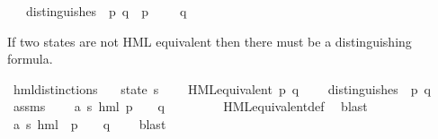 \begin{isabellebody}
\ \ \ {\isacartoucheopen}distinguishes\ {\isasymphi}\ p\ q\ {\isasymequiv}\ p\ {\isasymTurnstile}\ {\isasymphi}\ {\isasymand}\ {\isasymnot}\ q\ {\isasymTurnstile}\ {\isasymphi}{\isacartoucheclose}%
\begin{isamarkuptext}%
If two states are not HML equivalent then there must be a
  distinguishing formula.%
\end{isamarkuptext}\isamarkuptrue%
\isamarkupfalse%
\ hml{\isacharunderscore}{\kern0pt}distinctions{\isacharcolon}{\kern0pt}\isanewline
\ \ \ state{\isacharcolon}{\kern0pt}{\isacharcolon}{\kern0pt}\ {\isacharprime}{\kern0pt}s\isanewline
\ \ \ {\isacartoucheopen}{\isasymnot}\ HML{\isacharunderscore}{\kern0pt}equivalent\ p\ q{\isacartoucheclose}\isanewline
\ \ \ {\isacartoucheopen}{\isasymexists}{\isasymphi}{\isachardot}{\kern0pt}\ distinguishes\ {\isasymphi}\ p\ q{\isacartoucheclose}\isanewline
%
\isadelimproof
%
\endisadelimproof
%
\isatagproof
{}\isamarkupfalse%
{\isacharminus}{\kern0pt}\isanewline
\ \ \isamarkupfalse%
\ assms\ \isamarkupfalse%
\ {\isachardoublequoteopen}{\isasymnot}\ {\isacharparenleft}{\kern0pt}{\isasymforall}\ {\isasymphi}{\isacharcolon}{\kern0pt}{\isacharcolon}{\kern0pt}{\isacharparenleft}{\kern0pt}{\isacharprime}{\kern0pt}a{\isacharcomma}{\kern0pt}\ {\isacharprime}{\kern0pt}s{\isacharparenright}{\kern0pt}\ hml{\isachardot}{\kern0pt}\ {\isacharparenleft}{\kern0pt}p\ {\isasymTurnstile}\ {\isasymphi}{\isacharparenright}{\kern0pt}\ {\isasymlongleftrightarrow}\ {\isacharparenleft}{\kern0pt}q\ {\isasymTurnstile}\ {\isasymphi}{\isacharparenright}{\kern0pt}{\isacharparenright}{\kern0pt}{\isachardoublequoteclose}\ \isanewline
\ \ \ \ \isamarkupfalse%
\ HML{\isacharunderscore}{\kern0pt}equivalent{\isacharunderscore}{\kern0pt}def\ \isamarkupfalse%
\ blast\isanewline
\ \ \isamarkupfalse%
\ \isamarkupfalse%
\ {\isasymphi}{\isacharcolon}{\kern0pt}{\isacharcolon}{\kern0pt}{\isachardoublequoteopen}{\isacharparenleft}{\kern0pt}{\isacharprime}{\kern0pt}a{\isacharcomma}{\kern0pt}\ {\isacharprime}{\kern0pt}s{\isacharparenright}{\kern0pt}\ hml{\isachardoublequoteclose}\ \ {\isachardoublequoteopen}{\isacharparenleft}{\kern0pt}p\ {\isasymTurnstile}\ {\isasymphi}{\isacharparenright}{\kern0pt}\ {\isasymnoteq}\ {\isacharparenleft}{\kern0pt}q\ {\isasymTurnstile}\ {\isasymphi}{\isacharparenright}{\kern0pt}{\isachardoublequoteclose}\ \isamarkupfalse%
\ blast\isanewline

\end{isabellebody}
